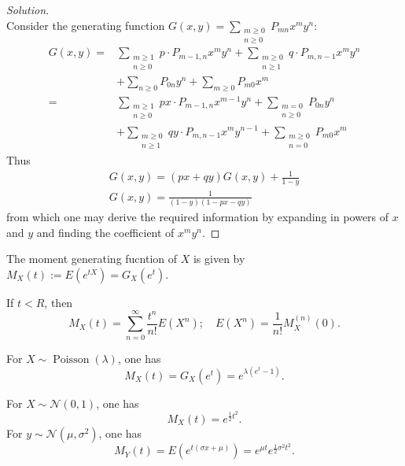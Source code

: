 \documentclass[11pt,singlecolumn, openany, citestyle=authoryear]{elegantbook}
\begin{document}
\begin{CJK}{UTF8}{gbsn}
\begin{proof}[Solution]
$$    $$
    Consider the generating function $G(x,y)=\displaystyle \sum_{\substack{m\geqslant 0\\
    n\geqslant 0}}P_{mn}x^my^n$:
    \begin{align*}
    G(x,y)=&
    \sum_{\substack{m\geqslant 1 \\ n\geqslant 0}}p\cdot P_{m-1,n}x^my^n+
    \sum_{\substack{m\geqslant 0 \\ n\geqslant 1}}q\cdot P_{m,n-1}x^my^n\\
    &+\sum_{n\geqslant 0}P_{0n}y^n+\sum_{m\geqslant 0}P_{m0}x^m\\
    =&\sum_{\substack{m\geqslant 1 \\ n\geqslant 0}}px\cdot P_{m-1,n}x^{m-1}y^n
    +\sum_{\substack{m=0 \\ n\geqslant 0}}P_{0n}y^n \\
    &+ \sum_{\substack{m\geqslant 0 \\ n\geqslant 1}}qy\cdot P_{m,n-1}x^my^{n-1}
    +\sum_{\substack{m\geqslant 0 \\ n=0}}P_{m0}x^m
    \end{align*}
    Thus 
\begin{gather*}
    G(x,y)=(px+qy)G(x,y)+\frac{1}{1-y}\\
    G(x,y)=\frac{1}{(1-y)(1-px-qy)}
\end{gather*}
from which one may derive the required information by expanding in powers of $x$ and $y$ and
finding the coefficient of $x^my^n$.
\end{proof}

\begin{definition}
    The moment generating fucntion of $X$ is given by 
    $M_X(t):=E(e^{tX})=G_X(e^t)$.
\end{definition}
If $t<R$, then 
$$
M_X(t)=\sum_{n=0}^\infty \frac{t^n}{n!}E(X^n);\quad 
E(X^n)=\frac{1}{n!}M_X^{(n)}(0).
$$

\begin{example}
    For $X\sim \operatorname{Poisson}(\lambda)$, one has 
    $$
    M_X(t)=G_X(e^t)=e^{\lambda(e^t-1)}.
    $$
\end{example}
\begin{example}
    For $X\sim \mathcal{N}(0,1)$, one has 
    $$
    M_X(t)=e^{\frac{1}{2}t^2}.
    $$
    For $y\sim\mathcal{N}(\mu,\sigma^2)$, one has 
    $$
    M_Y(t)=E(e^{t(\sigma x + \mu)})=e^{\mu t}e^{\frac{1}{2}\sigma^2t^2}.
    $$
\end{example}


\end{CJK}
\end{document}
